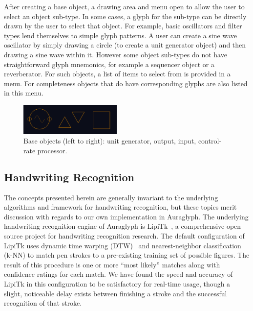 \documentclass{nime-alternate}
\begin{document}
After creating a base object, a drawing area and menu open to allow the user to select an object sub-type. 
In some cases, a glyph for the sub-type can be directly drawn by the user to select that object. 
For example, basic oscillators and filter types lend themselves to simple glyph patterns. 
A user can create a sine wave oscillator by simply drawing a circle (to create a unit generator object) and then drawing a sine wave within it. 
However some object sub-types do not have straightforward glyph mnemonics, for example a sequencer object or a reverberator. 
For such objects, a list of items to select from is provided in a menu. 
For completeness objects that do have corresponding glyphs are also listed in this menu. 

\begin{figure}[h]
	\centering
		\includegraphics[width=0.45\textwidth]{figures/baseobjects.png}
	\caption{Base objects (left to right): unit generator, output, input, control-rate processor.}
	\label{fig:baseObjects}
\end{figure}

\subsection{Handwriting Recognition}
\label{sec:HandwritingRecognition}

The concepts presented herein are generally invariant to the underlying algorithms and framework for handwriting recognition, but these topics merit discussion with regards to our own implementation in Auraglyph. 
The underlying handwriting recognition engine of Auraglyph is LipiTk~\cite{madhvanath2007lipitk}, a comprehensive open-source project for handwriting recognition research. 
The default configuration of LipiTk uses dynamic time warping (DTW)~\cite{niels2005using} and nearest-neighbor classification (k-NN) to match pen strokes to a pre-existing training set of possible figures. 
The result of this procedure is one or more ``most likely'' matches along with confidence ratings for each match. 
We have found the speed and accuracy of LipiTk in this configuration to be satisfactory for real-time usage, though a slight, noticeable delay exists between finishing a stroke and the successful recognition of that stroke. 
\end{document}
